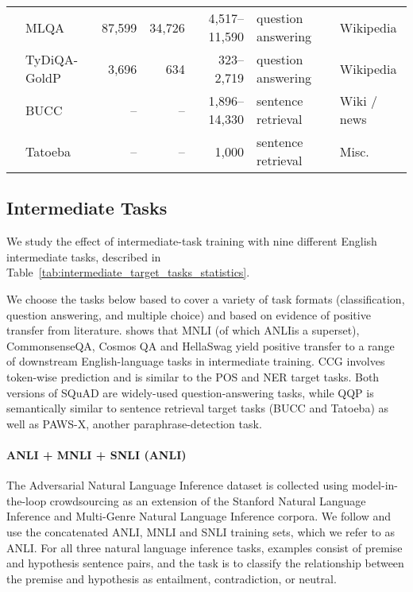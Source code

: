 \documentclass[11pt,a4paper]{article}
\newcommand{\anli}{ANLI}
\begin{document}
\begin{table*}[t]
\begin{tabular}{llrrrll}
    & MLQA & 87,599 & 34,726 & 4,517--11,590 & question answering & Wikipedia \\
    & TyDiQA-GoldP & 3,696 & 634 & 323--2,719 & question answering & Wikipedia  \\
    & BUCC & -- & -- & 1,896--14,330 & sentence retrieval & Wiki / news \\
    & Tatoeba & -- & -- & 1,000 & sentence retrieval & Misc. \\
    \bottomrule
  \end{tabular}
  \caption{Overview of the intermediate tasks ({top}) and target tasks ({bottom}) in our experiments. For target tasks, \textit{Train} and \textit{Dev} correspond to the English training and development sets, while \textit{Test} shows the range of sizes for the target-language test sets for each task. XQuAD, TyDiQA and Tateoba do not have separate held-out development sets.}
  \label{tab:intermediate_target_tasks_statistics}
\end{table*}


\subsection{Intermediate Tasks}\label{sec:intermediate_tasks}

We study the effect of intermediate-task training \citep[STILTs;][]{Phang2018SentenceEO} with nine different English intermediate tasks, described in Table~\ref{tab:intermediate_target_tasks_statistics}.

We choose the tasks below based to cover a variety of task formats (classification, question answering, and multiple choice) and based on evidence of positive transfer from literature. \citet{pruksachatkun2020intermediate} shows that MNLI (of which \anli is a superset), CommonsenseQA, Cosmos QA and HellaSwag yield positive transfer to a range of downstream English-language tasks in intermediate training.
CCG involves token-wise prediction and is similar to the POS and NER target tasks. Both versions of SQuAD are widely-used question-answering tasks, while QQP is semantically similar to sentence retrieval target tasks (BUCC and Tatoeba) as well as PAWS-X, another paraphrase-detection task.


\paragraph{ANLI + MNLI + SNLI (\anli)} The Adversarial Natural Language Inference dataset \citep{nie2019adversarial} is collected using model-in-the-loop crowdsourcing as an extension of the Stanford Natural Language Inference \citep[SNLI;][]{snli:emnlp2015} and Multi-Genre Natural Language Inference \citep[MNLI;][]{mnli} corpora. We follow \citet{nie2019adversarial} and use the concatenated ANLI, MNLI and SNLI training sets, which we refer to as \anli. For all three natural language inference tasks, examples consist of premise and hypothesis sentence pairs, and the task is to classify the relationship between the premise and hypothesis as entailment, contradiction, or neutral.
\end{document}
